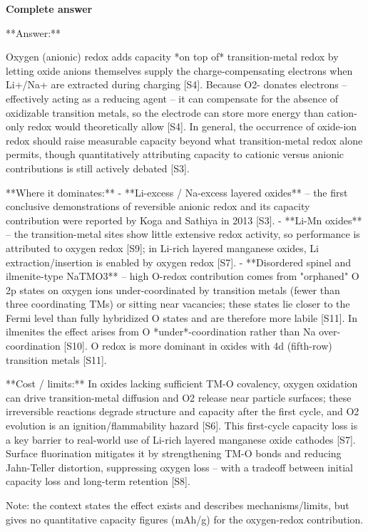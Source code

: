 \documentclass[10pt]{article}
\begin{document}
\textbf{Complete answer}
\begin{AnswerText}
**Answer:**

Oxygen (anionic) redox adds capacity *on top of* transition-metal redox by letting oxide anions themselves supply the charge-compensating electrons when Li+/Na+ are extracted during charging [S4]. Because O2- donates electrons -- effectively acting as a reducing agent -- it can compensate for the absence of oxidizable transition metals, so the electrode can store more energy than cation-only redox would theoretically allow [S4]. In general, the occurrence of oxide-ion redox should raise measurable capacity beyond what transition-metal redox alone permits, though quantitatively attributing capacity to cationic versus anionic contributions is still actively debated [S3].

**Where it dominates:**
- **Li-excess / Na-excess layered oxides** -- the first conclusive demonstrations of reversible anionic redox and its capacity contribution were reported by Koga and Sathiya in 2013 [S3].
- **Li-Mn oxides** -- the transition-metal sites show little extensive redox activity, so performance is attributed to oxygen redox [S9]; in Li-rich layered manganese oxides, Li extraction/insertion is enabled by oxygen redox [S7].
- **Disordered spinel and ilmenite-type NaTMO3** -- high O-redox contribution comes from "orphaned" O 2p states on oxygen ions under-coordinated by transition metals (fewer than three coordinating TMs) or sitting near vacancies; these states lie closer to the Fermi level than fully hybridized O states and are therefore more labile [S11]. In ilmenites the effect arises from O *under*-coordination rather than Na over-coordination [S10]. O redox is more dominant in oxides with 4d (fifth-row) transition metals [S11].

**Cost / limits:** In oxides lacking sufficient TM-O covalency, oxygen oxidation can drive transition-metal diffusion and O2 release near particle surfaces; these irreversible reactions degrade structure and capacity after the first cycle, and O2 evolution is an ignition/flammability hazard [S6]. This first-cycle capacity loss is a key barrier to real-world use of Li-rich layered manganese oxide cathodes [S7]. Surface fluorination mitigates it by strengthening TM-O bonds and reducing Jahn-Teller distortion, suppressing oxygen loss -- with a tradeoff between initial capacity loss and long-term retention [S8].

Note: the context states the effect exists and describes mechanisms/limits, but gives no quantitative capacity figures (mAh/g) for the oxygen-redox contribution.
\end{AnswerText}
\end{document}
